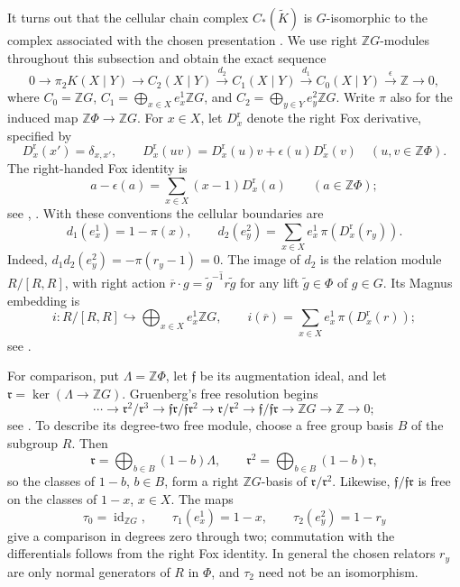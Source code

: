 \documentclass[11pt,a4paper]{article}
\begin{document}
It turns out that the cellular chain complex $C_*(\widetilde K)$ is
$G$-isomorphic to the complex associated with the chosen presentation
\cite[Proposition~9]{BH1}.  We use right $\mathbb ZG$-modules throughout
this subsection and obtain the exact sequence
\begin{equation}\label{1.1}
0\longrightarrow\pi_2K(X\mid Y)\longrightarrow C_2(X\mid Y)
\xrightarrow{d_2}C_1(X\mid Y)\xrightarrow{d_1}C_0(X\mid Y)
\xrightarrow{\epsilon}\mathbb Z\longrightarrow0,
\end{equation}
where $C_0=\mathbb ZG$, $C_1=\bigoplus_{x\in X}e_x^1\mathbb ZG$,
and $C_2=\bigoplus_{y\in Y}e_y^2\mathbb ZG$.
Write $\pi$ also for the induced map $\mathbb Z\Phi\to\mathbb ZG$.
For $x\in X$, let $D_x^{\mathrm r}$ denote the right Fox derivative,
specified by
\[
 D_x^{\mathrm r}(x')=\delta_{x,x'},\qquad
 D_x^{\mathrm r}(uv)=D_x^{\mathrm r}(u)v+
                         \epsilon(u)D_x^{\mathrm r}(v)
 \quad(u,v\in\mathbb Z\Phi).
\]
The right-handed Fox identity is
\[
 a-\epsilon(a)=\sum_{x\in X}(x-1)D_x^{\mathrm r}(a)
 \qquad(a\in\mathbb Z\Phi);
\]
see \cite[Chapter~4]{BH1}, \cite[Section~4.2]{FENN}.
With these conventions the cellular boundaries are
\[
 d_1(e_x^1)=1-\pi(x),\qquad
 d_2(e_y^2)=\sum_{x\in X}e_x^1\,\pi(D_x^{\mathrm r}(r_y)).
\]
Indeed, $d_1d_2(e_y^2)=-\pi(r_y-1)=0$.
The image of $d_2$ is the relation module $R/[R,R]$, with right action
$\overline r\cdot g=\overline{\widetilde g^{-1}r\widetilde g}$ for
any lift $\widetilde g\in\Phi$ of $g\in G$.  Its Magnus embedding is
\[
 i:R/[R,R]\hookrightarrow\bigoplus_{x\in X}e_x^1\mathbb ZG,
 \qquad
 i(\overline r)=\sum_{x\in X}e_x^1\,\pi(D_x^{\mathrm r}(r));
\]
see \cite[Corollary~1]{BH1}.

For comparison, put $\Lambda=\mathbb Z\Phi$, let $\mathfrak f$ be
its augmentation ideal, and let
$\mathfrak r=\ker(\Lambda\to\mathbb ZG)$.
Gruenberg's free resolution begins
\begin{equation}\label{1.2}
\cdots\longrightarrow\mathfrak r^2/\mathfrak r^3
\longrightarrow\mathfrak f\mathfrak r/\mathfrak f\mathfrak r^2
\longrightarrow\mathfrak r/\mathfrak r^2
\longrightarrow\mathfrak f/\mathfrak f\mathfrak r
\longrightarrow\mathbb ZG\longrightarrow\mathbb Z\longrightarrow0;
\end{equation}
see \cite[Theorem~2]{Gru}.  To describe its degree-two free module,
choose a free group basis $B$ of the subgroup $R$.  Then
\[
 \mathfrak r=\bigoplus_{b\in B}(1-b)\Lambda,
 \qquad
 \mathfrak r^2=\bigoplus_{b\in B}(1-b)\mathfrak r,
\]
so the classes of $1-b$, $b\in B$, form a right $\mathbb ZG$-basis
of $\mathfrak r/\mathfrak r^2$.
Likewise, $\mathfrak f/\mathfrak f\mathfrak r$ is free on the classes
of $1-x$, $x\in X$.  The maps
\[
 \tau_0=\operatorname{id}_{\mathbb ZG},\qquad
 \tau_1(e_x^1)=1-x,\qquad \tau_2(e_y^2)=1-r_y
\]
give a comparison in degrees zero through two; commutation with the
differentials follows from the right Fox identity.  In general the
chosen relators $r_y$ are only normal generators of $R$ in $\Phi$,
and $\tau_2$ need not be an isomorphism.
\end{document}
